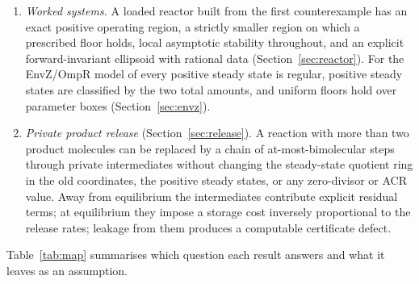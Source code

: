 \documentclass[11pt,a4paper]{article}
\theoremstyle{plain}
\theoremstyle{definition}
\theoremstyle{remark}
\begin{document}
\begin{enumerate}[label=(\arabic*)]
\item \emph{Worked systems.} A loaded reactor built from the first counterexample has an exact positive operating region, a strictly smaller region on which a prescribed floor holds, local asymptotic stability throughout, and an explicit forward-invariant ellipsoid with rational data (Section~\ref{sec:reactor}). For the EnvZ/OmpR model of \cite{shinarfeinberg} every positive steady state is regular, positive steady states are classified by the two total amounts, and uniform floors hold over parameter boxes (Section~\ref{sec:envz}).
\item \emph{Private product release} (Section~\ref{sec:release}). A reaction with more than two product molecules can be replaced by a chain of at-most-bimolecular steps through private intermediates without changing the steady-state quotient ring in the old coordinates, the positive steady states, or any zero-divisor or ACR value. Away from equilibrium the intermediates contribute explicit residual terms; at equilibrium they impose a storage cost inversely proportional to the release rates; leakage from them produces a computable certificate defect.
\end{enumerate}

Table~\ref{tab:map} summarises which question each result answers and what it leaves as an assumption.
\end{document}
